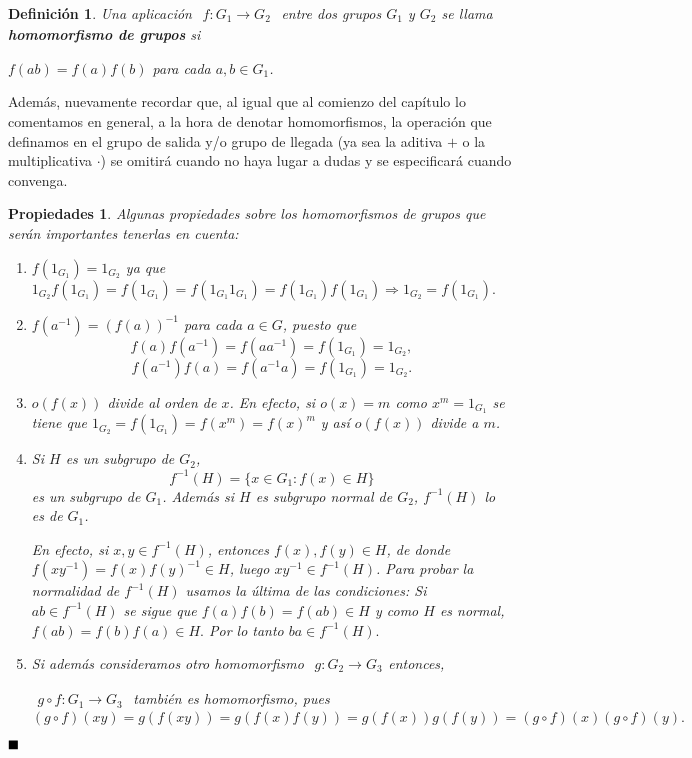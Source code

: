 \documentclass[12pt]{article}
\newtheorem{definition}[theorem]{Definición}
\newtheorem{properties}{Propiedades}[theorem]
\begin{document}
\begin{definition}Una aplicación $
\begin{array}{rccl}
f\colon G_{1} \longrightarrow  G_{2}
\end{array}
$ entre dos grupos $G_{1}$ y $G_{2}$ se llama \textbf{homomorfismo de grupos} si
\begin{center}
$f(ab) = f(a)f(b)$ para cada $a,b \in G_{1}$.
\end{center}
\end{definition}

Además, nuevamente recordar que, al igual que al comienzo del capítulo lo comentamos en general, a la hora de denotar homomorfismos, la operación que definamos en el grupo de salida y/o grupo de llegada (ya sea la aditiva $+$ o la multiplicativa $\cdot$) se omitirá cuando no haya lugar a dudas y se especificará cuando convenga.

\begin{properties} Algunas propiedades sobre los homomorfismos de grupos que serán importantes tenerlas en cuenta:
\begin{enumerate}
\item $f(1_{G_{1}}) = 1_{G_{2}}$ ya que $1_{G_{2}}f(1_{G_{1}}) = f(1_{G_{1}}) = f(1_{G_{1}}1_{G_{1}}) = f(1_{G_{1}})f(1_{G_{1}}) \Longrightarrow 1_{G_{2}} = f(1_{G_{1}}).$
\item $f(a^{-1}) = (f(a))^{-1}$ para cada $a \in G$, puesto que $$f(a)f(a^{-1}) = f(aa^{-1}) = f(1_{G_{1}}) = 1_{G_{2}},$$ $$f(a^{-1})f(a) = f(a^{-1}a) = f(1_{G_{1}}) = 1_{G_{2}}.$$
\item $o(f(x))$ divide al orden de $x$. En efecto, si $o(x) = m$ como $x^{m} = 1_{G_{1}}$ se tiene que $1_{G_{2}} = f(1_{G_{1}}) = f(x^{m}) = f(x)^{m}$ y así $o(f(x))$ divide a $m$. 
\item Si $H$ es un subgrupo de $G_{2}$, $$f^{-1}(H) = \lbrace x \in G_{1} : f(x) \in H\rbrace$$ es un subgrupo de $G_{1}$. Además si $H$ es subgrupo normal de $G_{2}$, $f^{-1}(H)$ lo es de $G_{1}$.

En efecto, si $x,y \in f^{-1}(H)$, entonces $f(x),f(y) \in H$, de donde $f(xy^{-1}) = f(x)f(y)^{-1} \in H$, luego $xy^{-1} \in f^{-1}(H)$. Para probar la normalidad de $f^{-1}(H)$ usamos la última de las condiciones: Si $ab \in f^{-1}(H)$ se sigue que $f(a)f(b) = f(ab) \in H$ y como $H$ es normal, $f(ab) = f(b)f(a) \in H.$ Por lo tanto $ba \in f^{-1}(H).$
 
\item Si además consideramos otro homomorfismo $
\begin{array}{rccl}
g\colon G_{2} \longrightarrow  G_{3}
\end{array}
$entonces,

$\begin{array}{rccl}
g \circ f\colon G_{1} \longrightarrow  G_{3}
\end{array}
$ también es homomorfismo, pues $$ (g \circ f)(xy) = g(f(xy)) = g(f(x)f(y)) = g(f(x))g(f(y)) = (g \circ f)(x) (g \circ f)(y).$$
\end{enumerate}
\end{properties}
$\hfill \blacksquare$
\end{document}
